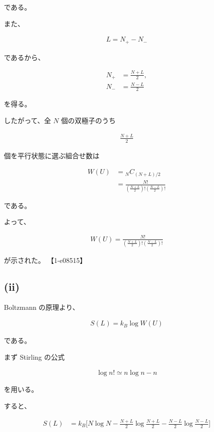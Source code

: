 \documentclass[platex,dvipdfmx,a4paper]{jsarticle}
\begin{document}
である。

また、

\begin{align*}
L=N_+-N_-
\end{align*}

であるから、

\begin{align*}
N_+
&=
\frac{N+L}{2},
\\
N_-
&=
\frac{N-L}{2}
\end{align*}

を得る。

したがって、全 $N$ 個の双極子のうち

\begin{align*}
\frac{N+L}{2}
\end{align*}

個を平行状態に選ぶ組合せ数は

\begin{align*}
W(U)
&=
{}_N C_{(N+L)/2}
\\
&=
\frac{N!}
{\left(\frac{N+L}{2}\right)!
 \left(\frac{N-L}{2}\right)!}
\end{align*}

である。

よって、

\begin{align*}
W(U)
=
\frac{N!}
{\left(\frac{N+L}{2}\right)!
 \left(\frac{N-L}{2}\right)!}
\end{align*}

が示された。 【1-e08515】

\subsection{(ii)}

Boltzmann の原理より、

\begin{align*}
S(L)
=
k_B\log W(U)
\end{align*}

である。

まず Stirling の公式

\begin{align*}
\log n!
\simeq
n\log n-n
\end{align*}

を用いる。

すると、

\begin{align*}
S(L)
&=
k_B
\Biggl[
N\log N
-\frac{N+L}{2}
\log\frac{N+L}{2}
-\frac{N-L}{2}
\log\frac{N-L}{2}
\Biggr]
\end{align*}
\end{document}
